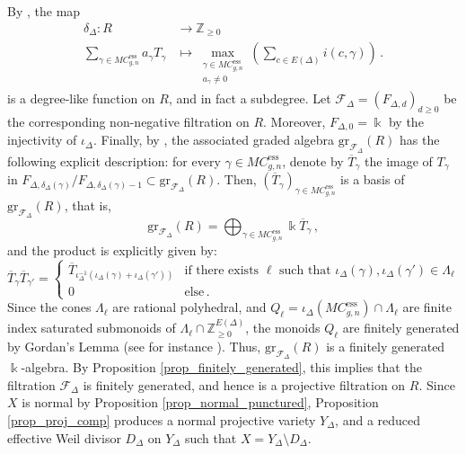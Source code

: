 \documentclass[12pt,letterpaper, reqno]{amsart}
\theoremstyle{defstyle} \newtheorem{definition}[theorem]{Definition}
\theoremstyle{remark}
\numberwithin{equation}{section}
\numberwithin{figure}{section}
\newcommand{\cF} {\mathcal{F}}
\newcommand{\gr} {\mathrm{gr}}
\newcommand{\kk} {\Bbbk}
\newcommand{\ZZ} {\mathbb{Z}}
\begin{document}
By \cite[\S 2.4]{farajzadeh2023compactifications}, the map
\begin{align} \label{eq_delta_Delta} \delta_\Delta: R &\longrightarrow \ZZ_{\geq 0}\\
\sum_{\gamma \in MC_{g,n}^{\mathrm{ess}}} a_\gamma T_\gamma &\longmapsto \max_{\substack{\gamma \in MC_{g,n}^{\mathrm{ess}} \\ \nonumber
a_\gamma \neq 0}} \left( \sum_{c \in E(\Delta)} i(c, \gamma) \right) \,.
\end{align}
is a degree-like function on $R$, and in fact a subdegree. Let $\cF_\Delta=(F_{\Delta,d})_{d\geq 0}$ be the corresponding non-negative filtration on $R$. Moreover, $F_{\Delta,0}=\kk$ by the injectivity of $\iota_\Delta$. 
Finally, by \cite[\S 2.4]{farajzadeh2023compactifications}, the associated graded algebra $\gr_{\cF_\Delta}(R)$ has the following explicit description: for every $\gamma \in MC_{g,n}^{\mathrm{ess}}$, denote by $\overline{T}_\gamma$ the image of $T_\gamma$ in $F_{\Delta, \delta_\Delta(\gamma)}/F_{\Delta, \delta_\Delta(\gamma)-1} \subset \gr_{\cF_\Delta}(R)$. Then, $(\overline{T}_\gamma)_{\gamma \in MC_{g,n}^{\mathrm{ess}}}$ is a basis of $\gr_{\cF_\Delta}(R)$, that is,
\[ \gr_{\cF_\Delta}(R) = \bigoplus_{\gamma \in MC_{g,n}^{\mathrm{ess}}} \kk \overline{T}_\gamma \,,\]
and the product is explicitly given by:
\begin{equation} \label{eq_algebra_punctured}
\overline{T}_\gamma \overline{T}_{\gamma'}
=\begin{cases} \overline{T}_{\iota_{\Delta}^{-1}(\iota_\Delta(\gamma)+ \iota_\Delta(\gamma'))} &\text{if there exists  }\ell \text{   such that }\iota_\Delta(\gamma), \iota_\Delta(\gamma') \in \Lambda_\ell\\ 0&\text{else}\,.\end{cases}
\end{equation}
Since the cones $\Lambda_\ell$ are rational polyhedral, and $Q_\ell=\iota_\Delta(MC_{g,n}^{
\mathrm{ess}}) \cap \Lambda_\ell$
are finite index saturated submonoids of $\Lambda_\ell \cap \ZZ_{\geq 0}^{E(\Delta)}$, the monoids $Q_\ell$ are finitely generated by Gordan's Lemma (see for instance \cite[Proposition 1.2.17]{CLS}). Thus, $
\gr_{\cF_\Delta}(R)$ is a finitely generated $\kk$-algebra. 
By Proposition \ref{prop_finitely_generated}, this implies that the filtration $\cF_\Delta$ is finitely generated, and hence is a projective filtration on $R$.
Since $X$ is normal by Proposition \ref{prop_normal_punctured}, Proposition \ref{prop_proj_comp} produces 
a normal projective variety $Y_\Delta$, and a reduced effective Weil divisor $D_\Delta$ on $Y_\Delta$ such that $X=Y_\Delta \setminus D_\Delta$. 
\end{document}
